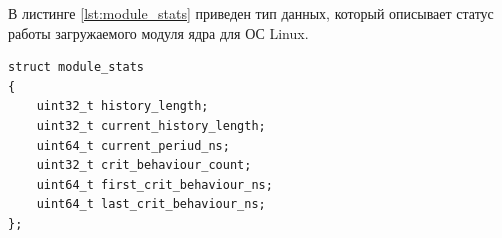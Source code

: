 \documentclass{bmstu}
\begin{document}
В листинге \ref{lst:module_stats} приведен тип данных, который описывает статус работы загружаемого модуля ядра для ОС Linux.
\begin{lstlisting}[caption = {module\_stats}, label=lst:module_stats]
struct module_stats
{
    uint32_t history_length;
    uint32_t current_history_length;
    uint64_t current_periud_ns;
    uint32_t crit_behaviour_count;
    uint64_t first_crit_behaviour_ns;
    uint64_t last_crit_behaviour_ns;
};
\end{lstlisting}






\end{document}
